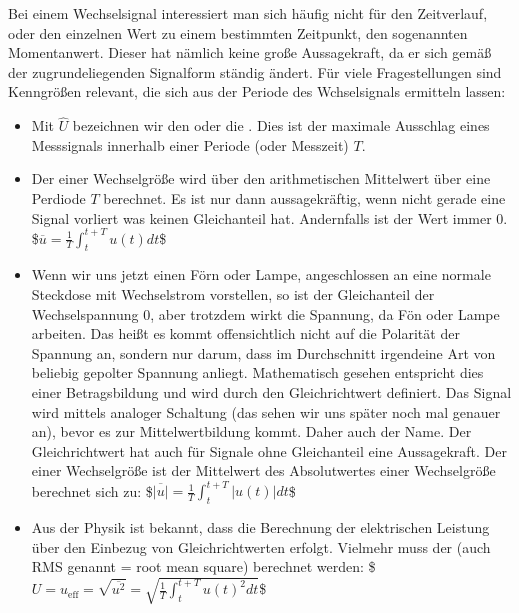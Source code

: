 \documentclass[letterpaper,10pt,english]{jupyterBook}
\begin{document}
\sphinxAtStartPar
Bei einem Wechselsignal interessiert man sich häufig nicht für den Zeitverlauf, oder den einzelnen Wert zu einem bestimmten Zeitpunkt, den sogenannten Momentanwert. Dieser hat nämlich keine große Aussagekraft, da er sich gemäß der zugrundeliegenden Signalform ständig ändert. Für viele Fragestellungen sind Kenngrößen relevant, die sich aus der Periode des Wchselsignals ermitteln lassen:
\begin{itemize}
\item {} 
\sphinxAtStartPar
Mit \(\hat U\) bezeichnen wir den  oder die . Dies ist der maximale Ausschlag eines Messsignals innerhalb einer Periode (oder Messzeit) \(T\).

\item {} 
\sphinxAtStartPar
Der  einer Wechselgröße wird über den arithmetischen Mittelwert über eine Perdiode \(T\) berechnet. Es ist nur dann aussagekräftig, wenn nicht gerade eine Signal vorliert was keinen Gleichanteil hat. Andernfalls ist der Wert immer 0.
\$\(\overline u = \frac{1}{T}\int_{t}^{t+T} u(t)dt\)\$

\item {} 
\sphinxAtStartPar
Wenn wir uns jetzt einen Förn oder Lampe, angeschlossen an eine normale Steckdose mit Wechselstrom vorstellen, so ist der Gleichanteil der Wechselspannung 0, aber trotzdem wirkt die Spannung, da Fön oder Lampe arbeiten. Das heißt es kommt offensichtlich nicht auf die Polarität der Spannung an, sondern nur darum, dass im Durchschnitt irgendeine Art von beliebig gepolter Spannung anliegt. Mathematisch gesehen entspricht dies einer Betragsbildung und wird durch den Gleichrichtwert definiert.  Das Signal wird mittels analoger Schaltung  (das sehen wir uns später noch mal genauer an), bevor es zur Mittelwertbildung kommt. Daher auch der Name. Der Gleichrichtwert hat auch für Signale ohne Gleichanteil eine Aussagekraft. Der  einer Wechselgröße ist der Mittelwert des Absolutwertes einer Wechselgröße berechnet sich zu:
\$\(\overline{|u|} = \frac{1}{T}\int_{t}^{t+T} |u(t)|dt\)\$

\item {} 
\sphinxAtStartPar
Aus der Physik ist bekannt, dass die Berechnung der elektrischen Leistung  über den Einbezug von Gleichrichtwerten erfolgt. Vielmehr muss der  (auch RMS genannt = root mean square) berechnet werden:
\$\(U = u_\mathrm{eff} = \sqrt{\overline{u^2}} = \sqrt{\frac{1}{T}\int_{t}^{t+T}u(t)^2dt}\)\$


\end{itemize}
\end{document}
